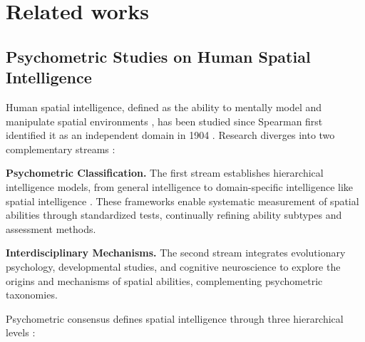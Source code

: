 \section{Related works}


\subsection{Psychometric Studies on Human Spatial Intelligence}

Human spatial intelligence, defined as the ability to mentally model and manipulate spatial environments \cite{bornsteinFramesMindTheory1986}, has been studied since Spearman first identified it as an independent domain in 1904 \cite{spearmanGeneralIntelligenceObjectively1904}. Research diverges into two complementary streams \cite{poratSpatialAbilityUnderstanding2023}:

\textbf{Psychometric Classification.} The first stream establishes hierarchical intelligence models, from general intelligence to domain-specific intelligence like spatial intelligence \cite{gearySpatialAbilityDistinct2022, spearmanGeneralIntelligenceObjectively1904}. These frameworks enable systematic measurement of spatial abilities through standardized tests, continually refining ability subtypes and assessment methods.

\textbf{Interdisciplinary Mechanisms.} The second stream integrates evolutionary psychology, developmental studies, and cognitive neuroscience to explore the origins and mechanisms of spatial abilities, complementing psychometric taxonomies.

Psychometric consensus defines spatial intelligence through three hierarchical levels \cite{caemmererIndividualIntelligenceTests2020, mcgrewCHCTheoryHuman2009, johnsonStructureHumanIntelligence2005, linnEmergenceCharacterizationSex1985, maccobyPsychologySexDifferences1974, michaelDescriptionSpatialvisualizationAbilities1957, thurstonePrimaryAbilitiesVisual1950}:

